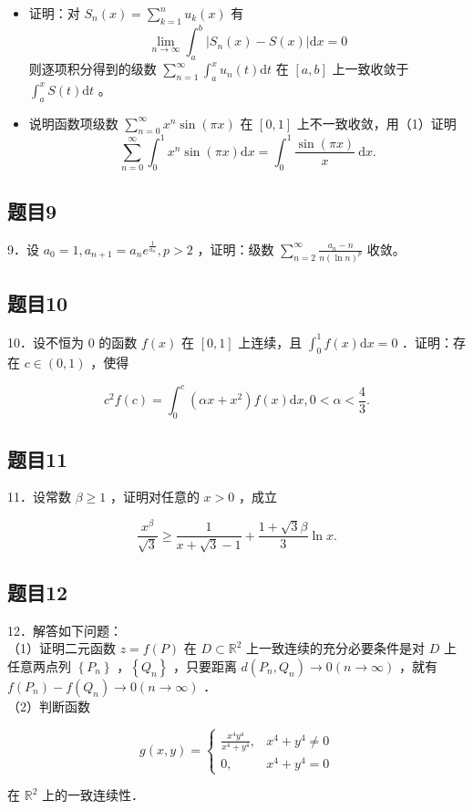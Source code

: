 \documentclass{article}
\begin{document}
\begin{itemize}
  \item[（1）] 证明：对 \(S_{n}(x)=\sum_{k=1}^{n} u_{k}(x)\) 有
\[
\lim _{n \rightarrow \infty} \int_{a}^{b}\left|S_{n}(x)-S(x)\right| \mathrm{d} x=0
\]
则逐项积分得到的级数 \(\sum_{n=1}^{\infty} \int_{a}^{x} u_{n}(t) \mathrm{d} t\) 在 \([a, b]\) 上一致收敛于 \(\int_{a}^{x} S(t) \mathrm{d} t\) 。
  \item[（2）] 说明函数项级数 \(\sum_{n=0}^{\infty} x^{n} \sin (\pi x)\) 在 \([0,1]\) 上不一致收敛，用（1）证明
\[
\sum_{n=0}^{\infty} \int_{0}^{1} x^{n} \sin (\pi x) \mathrm{d} x=\int_{0}^{1} \frac{\sin (\pi x)}{x} \mathrm{~d} x .
\]
\end{itemize}

\subsection{题目9}
9．设 \(a_{0}=1, a_{n+1}=a_{n} e^{\frac{1}{a_{n}}}, p>2\) ，证明：级数 \(\sum_{n=2}^{\infty} \frac{a_{n}-n}{n(\ln n)^{p}}\) 收敛。

\subsection{题目10}
10．设不恒为 0 的函数 \(f(x)\) 在 \([0,1]\) 上连续，且 \(\int_{0}^{1} f(x) \mathrm{d} x=0\) ．证明：存在 \(c \in(0,1)\) ，使得

\[
c^{2} f(c)=\int_{0}^{c}\left(\alpha x+x^{2}\right) f(x) \mathrm{d} x, 0<\alpha<\frac{4}{3} .
\]

\subsection{题目11}
11．设常数 \(\beta \geq 1\) ，证明对任意的 \(x>0\) ，成立

\[
\frac{x^{\beta}}{\sqrt{3}} \geq \frac{1}{x+\sqrt{3}-1}+\frac{1+\sqrt{3} \beta}{3} \ln x .
\]

\subsection{题目12}
12．解答如下问题：\\
（1）证明二元函数 \(z=f(P)\) 在 \(D \subset \mathbb{R}^{2}\) 上一致连续的充分必要条件是对 \(D\) 上任意两点列 \(\left\{P_{n}\right\}\) ，\(\left\{Q_{n}\right\}\) ，只要距离 \(d\left(P_{n}, Q_{n}\right) \rightarrow 0(n \rightarrow \infty)\) ，就有 \(f\left(P_{n}\right)-f\left(Q_{n}\right) \rightarrow 0(n \rightarrow \infty)\) ．\\
（2）判断函数

\[
g(x, y)= \begin{cases}\frac{x^{4} y^{4}}{x^{4}+y^{4}}, & x^{4}+y^{4} \neq 0 \\ 0, & x^{4}+y^{4}=0\end{cases}
\]

在 \(\mathbb{R}^{2}\) 上的一致连续性．
\end{document}
